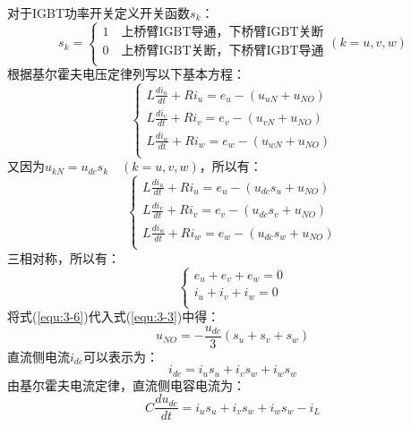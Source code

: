 对于IGBT功率开关定义开关函数$s_{k}$：
\begin{equation}
	s_{k} =
	\begin{cases}
		1 \quad \text{上桥臂IGBT导通，下桥臂IGBT关断} \\
		0 \quad \text{上桥臂IGBT关断，下桥臂IGBT导通} \\
	\end{cases}
	(k=u,v,w)
	\label{equ:SkR}
\end{equation}
根据基尔霍夫电压定律列写以下基本方程：
\begin{equation}
	\begin{cases}
		L\frac{di_{u}}{dt}+Ri_{u}=e_{u}-(u_{uN}+u_{NO})	\\
		L\frac{di_{v}}{dt}+Ri_{v}=e_{v}-(u_{vN}+u_{NO})	\\
		L\frac{di_{w}}{dt}+Ri_{w}=e_{w}-(u_{wN}+u_{NO})	\\
	\end{cases}
\end{equation}
又因为$u_{kN}=u_{dc}s_{k} \quad (k=u,v,w)$，所以有：
\begin{equation}
	\begin{cases}
		L\frac{di_{u}}{dt}+Ri_{u}=e_{u}-(u_{dc}s_{u}+u_{NO}) \\
		L\frac{di_{v}}{dt}+Ri_{v}=e_{v}-(u_{dc}s_{v}+u_{NO}) \\
		L\frac{di_{w}}{dt}+Ri_{w}=e_{w}-(u_{dc}s_{w}+u_{NO}) \\
	\end{cases}
	\label{equ:3-3}
\end{equation}
三相对称，所以有：
\begin{equation}
	\begin{cases}
		e_{u}+e_{v}+e_{w}=0	\\
		i_{u}+i_{v}+i_{w}=0 \\
	\end{cases}
	\label{equ:3-6}
\end{equation}
将式(\ref{equ:3-6})代入式(\ref{equ:3-3})中得：
\begin{equation}
	u_{NO}=-\frac{u_{dc}}{3} \left ( s_{u}+s_{v}+s_{w}  \right )
\end{equation}
直流侧电流$i_{dc}$可以表示为：
\begin{equation}
	i_{dc}=i_{u}s_{u}+i_{v}s_{w}+i_{w}s_{w}
\end{equation}
由基尔霍夫电流定律，直流侧电容电流为：
\begin{equation}
	C\frac{du_{dc}}{dt}=i_{u}s_{u}+i_{v}s_{w}+i_{w}s_{w}-i_{L}
\end{equation}

